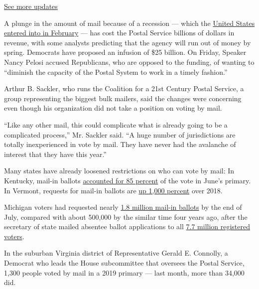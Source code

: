 \href{https://www.nytimes.com/2020/08/03/us/elections/biden-vs-trump.html?action=click\&pgtype=Article\&state=default\&region=MAIN_CONTENT_1\&context=storylines_live_updates}{See
more updates}

A plunge in the amount of mail because of a recession --- which the
\href{https://www.nytimes.com/2020/06/08/business/economy/us-economy-recession-2020.html}{United
States entered into in February} --- has cost the Postal Service
billions of dollars in revenue, with some analysts predicting that the
agency will run out of money by spring. Democrats have proposed an
infusion of \$25 billion. On Friday, Speaker Nancy Pelosi accused
Republicans, who are opposed to the funding, of wanting to ``diminish
the capacity of the Postal System to work in a timely fashion.''

Arthur B. Sackler, who runs the Coalition for a 21st Century Postal
Service, a group representing the biggest bulk mailers, said the changes
were concerning even though his organization did not take a position on
voting by mail.

``Like any other mail, this could complicate what is already going to be
a complicated process,'' Mr. Sackler said. ``A huge number of
jurisdictions are totally inexperienced in vote by mail. They have never
had the avalanche of interest that they have this year.''

Many states have already loosened restrictions on who can vote by mail:
In Kentucky, mail-in ballots
\href{https://www.whas11.com/article/news/local/kentucky-election-absentee-vote-turnout/417-23f2bb1e-ea9a-4c7e-8202-c33f54063ab6}{accounted
for 85 percent} of the vote in June's primary. In Vermont, requests for
mail-in ballots are
\href{https://www.sevendaysvt.com/OffMessage/archives/2020/07/03/absentee-ballot-requests-surge-in-vermont}{up
1,000 percent} over 2018.

Michigan voters had requested nearly
\href{https://www.michigan.gov/sos/0,4670,7-127--534590--,00.html}{1.8
million mail-in ballots} by the end of July, compared with about 500,000
by the similar time four years ago, after the secretary of state mailed
absentee ballot applications to all
\href{https://mvic.sos.state.mi.us/}{7.7 million registered voters}.

In the suburban Virginia district of Representative Gerald E. Connolly,
a Democrat who leads the House subcommittee that oversees the Postal
Service, 1,300 people voted by mail in a 2019 primary --- last month,
more than 34,000 did.

